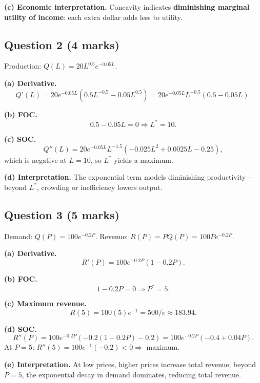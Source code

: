 \documentclass[12pt]{article}
\begin{document}
\textbf{(c) Economic interpretation.}
Concavity indicates \textbf{diminishing marginal utility of income}: each extra dollar adds less to utility.

\bigskip

\subsection*{Question 2 (4 marks)}

Production: \(Q(L)=20L^{0.5}e^{-0.05L}\).

\textbf{(a) Derivative.}
\[
Q'(L)=20e^{-0.05L}(0.5L^{-0.5}-0.05L^{0.5})
=20e^{-0.05L}L^{-0.5}(0.5-0.05L).
\]

\textbf{(b) FOC.}
\[
0.5-0.05L=0 \Rightarrow L^*=10.
\]

\textbf{(c) SOC.}
\[
Q''(L)=20e^{-0.05L}L^{-1.5}(-0.025L^2+0.0025L-0.25),
\]
which is negative at \(L=10\), so \(L^*\) yields a maximum.

\textbf{(d) Interpretation.}  
The exponential term models diminishing productivity—beyond \(L^*\), crowding or inefficiency lowers output.

\bigskip
\newpage
\subsection*{Question 3 (5 marks)}

Demand: \(Q(P)=100e^{-0.2P}\).  
Revenue: \(R(P)=PQ(P)=100P e^{-0.2P}\).

\textbf{(a) Derivative.}
\[
R'(P)=100e^{-0.2P}(1-0.2P).
\]

\textbf{(b) FOC.}
\[
1-0.2P=0\Rightarrow P^*=5.
\]

\textbf{(c) Maximum revenue.}
\[
R(5)=100(5)e^{-1}=500/e\approx183.94.
\]

\textbf{(d) SOC.}
\[
R''(P)=100e^{-0.2P}(-0.2(1-0.2P)-0.2)
=100e^{-0.2P}(-0.4+0.04P).
\]
At \(P=5\): \(R''(5)=100e^{-1}(-0.2)<0\Rightarrow\) maximum.

\textbf{(e) Interpretation.}  
At low prices, higher prices increase total revenue; beyond \(P=5\), the exponential decay in demand dominates, reducing total revenue.
\end{document}
